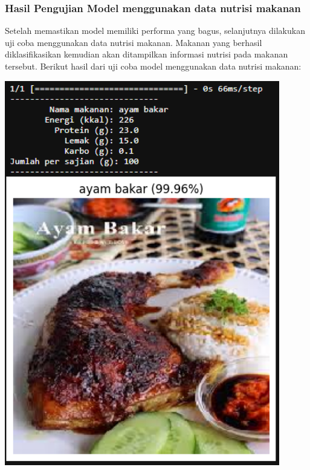 \subsubsection{Hasil Pengujian Model menggunakan data nutrisi makanan}
Setelah memastikan model memiliki performa yang bagus, selanjutnya dilakukan uji coba menggunakan data nutrisi makanan. Makanan yang berhasil diklasifikasikan kemudian akan ditampilkan informasi nutrisi pada makanan tersebut. Berikut hasil dari uji coba model menggunakan data nutrisi makanan: 
\begin{afigure}
    \includegraphics[height=0.55\textheight, width=0.9\textwidth, center]{images/predict-1-dgx.png}
    \label{fig:predict-1-dgx}
\end{afigure}
\pagebreak

